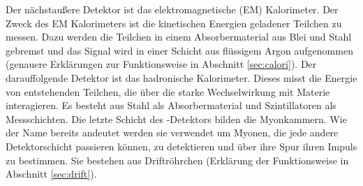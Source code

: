 Der nächstaußere Detektor ist das elektromagnetische (EM) Kalorimeter. Der Zweck des EM Kalorimeters ist die kinetischen Energien geladener Teilchen zu messen. Dazu werden die Teilchen in einem Absorbermaterial aus Blei und Stahl gebremst und das Signal wird in einer Schicht aus flüssigem Argon aufgenommen (genauere Erklärungen zur Funktionsweise in Abschnitt \ref{sec:calori}). 
Der darauffolgende Detektor ist das hadronische Kalorimeter. Dieses misst die Energie von entstehenden Teilchen, die über die starke Wechselwirkung mit Materie interagieren. Es besteht aus Stahl als Absorbermaterial und Szintillatoren als Messschichten.
Die letzte Schicht des \atlas-Detektors bilden die Myonkammern. Wie der Name bereits andeutet werden sie verwendet um Myonen, die jede andere Detektorschicht passieren können, zu detektieren und über ihre Spur ihren Impuls zu bestimmen. Sie bestehen aus Driftröhrchen (Erklärung der Funktionsweise in Abschnitt \ref{sec:drift}).

